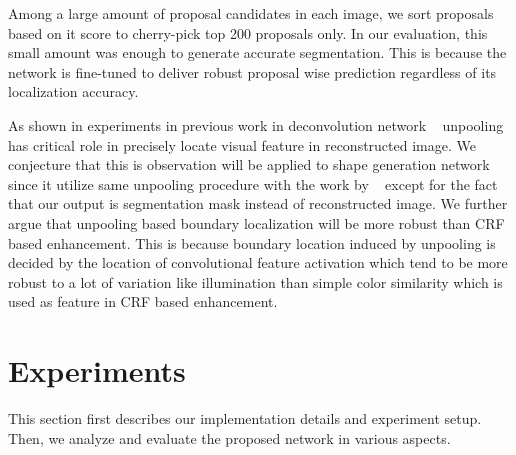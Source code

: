 \documentclass[10pt,twocolumn,letterpaper]{article}
\begin{document}
Among a large amount of proposal candidates in each image, we sort proposals based on it score to cherry-pick top 200 proposals only. 
In our evaluation, this small amount was enough to generate accurate segmentation. 
This is because the network is fine-tuned to deliver robust proposal wise prediction regardless of its localization accuracy. 
\fi

As shown in experiments in previous work in deconvolution network ~\cite{Deconvnet} unpooling has critical role in precisely locate visual feature in reconstructed image. 
We conjecture that this is observation will be applied to shape generation network since it utilize same unpooling procedure with the work by ~\cite{Deconvnet} except for the fact that our output is segmentation mask instead of reconstructed image. 
We further argue that unpooling based boundary localization will be more robust than CRF based enhancement. 
This is because boundary location induced by unpooling is decided by the location of convolutional feature activation which tend to be more robust to a lot of variation like illumination than simple color similarity which is used as feature in CRF based enhancement. 
\fi
 




\section{Experiments}
\label{sec:experiments}
\iffalse
We conduct experiment on SDN in two separate aspect. 
First experiment is about modeling performance of SDN alone. 
That is, we examine whether SDN model the shape well and how accurately the object boundary is located in various situation. 
Second experiment is conducted on the results of semantic segmentation. 
For evaluation we evaluate our result on PASCAL VOC 2012 test set.
\fi
This section first describes our implementation details and experiment setup.
Then, we analyze and evaluate the proposed network in various aspects.
\end{document}
